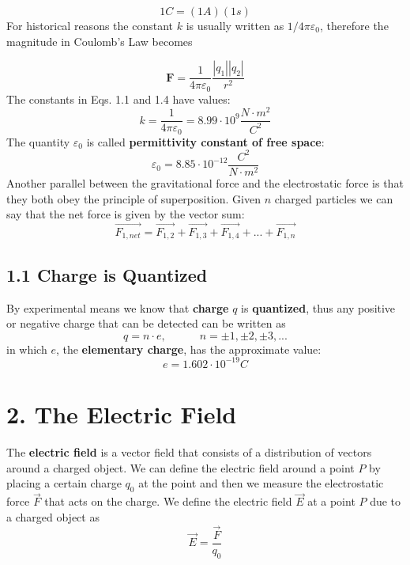 \documentclass[12pt, a4paper]{article}
\begin{document}
		\begin{equation*}
			1C = (1A)(1s)
		\end{equation*}
		For historical reasons the constant $k$ is usually written as $1/4\pi\varepsilon_0$, therefore the magnitude in Coulomb's Law becomes
		
		\begin{equation}
			\textbf{F} = \frac{1}{4\pi\varepsilon_0} \frac{|q_1||q_2|}{r^2} \tag{Coulomb's Law, 1-4}
		\end{equation}
		The constants in Eqs. 1.1 and 1.4 have values:
		\begin{equation*}
			k = \frac{1}{4\pi\varepsilon_0} = 8.99 \cdot 10^9  \frac{N\cdot m^2}{C^2} 
		\end{equation*}
		The quantity $\varepsilon_0$ is called \textbf{permittivity constant of free space}:
		\begin{equation*}
			\varepsilon_0 = 8.85 \cdot 10^{-12} \frac{C^2}{N\cdot m^2}
		\end{equation*}
		Another parallel between the gravitational force and the electrostatic force is that they both obey the principle of superposition. Given $n$ charged particles we can say that the net force is given by the vector sum:
		\begin{equation*}
			\vec{F_{1,net}} = \vec{F_{1,2}} + \vec{F_{1,3}} + \vec{F_{1,4}} + ... + \vec{F_{1,n}} \tag{1-5}
		\end{equation*}
		
		\subsection*{1.1 Charge is Quantized}
		By experimental means we know that \textbf{charge} $q$ is \textbf{quantized}, thus any positive or negative charge that can be detected can be written as 
		\begin{equation*}
			q = n\cdot e,\quad\quad\quad n = \pm1, \pm2, \pm3,...
		\end{equation*}
		in which $e$, the \textbf{elementary charge}, has the approximate value: 
		\begin{equation*}
			e = 1.602 \cdot 10^{-19} C
		\end{equation*}
	
		
		\section*{2. The Electric Field}
		The \textbf{electric field} is a vector field that consists of a distribution of vectors around a charged object. We can define the electric field around a point $P$ by placing a certain charge $q_0$ at the point and then we measure the electrostatic force $\vec{F}$ that acts on the charge. We define the electric field $\vec{E}$ at a point $P$ due to a charged object as
		\begin{equation*}
			\vec{E} = \frac{\vec{F}}{q_0} \tag{Electric Field 2-1}
		\end{equation*}
		
\end{document}
